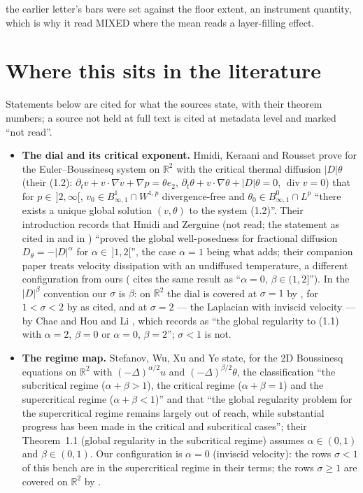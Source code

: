 \documentclass[11pt,a4paper]{article}
\newcommand{\R}{\mathbb{R}}
\newcommand{\abs}[1]{\lvert #1 \rvert}
\begin{document}
the earlier letter's bars were set against the floor extent, an instrument quantity, which is why it read MIXED where the mean reads a layer-filling effect.

\section{Where this sits in the literature}\label{sec:lit}

Statements below are cited for what the sources state, with their theorem numbers; a source not held at full text is cited at metadata level and marked ``not read''.

\begin{itemize}[leftmargin=1.5em]
\item \textbf{The dial and its critical exponent.} Hmidi, Keraani and Rousset \cite[Theorem~1.1]{HKR11} prove for the Euler--Boussinesq system on $\R^2$ with the critical thermal diffusion $\abs D\theta$ (their (1.2): $\partial_tv+v\cdot\nabla v+\nabla p=\theta e_2$, $\partial_t\theta+v\cdot\nabla\theta+\abs D\theta=0$, $\operatorname{div}v=0$) that for $p\in\,]2,\infty[$, $v_0\in B^1_{\infty,1}\cap W^{1,p}$ divergence-free and $\theta_0\in B^0_{\infty,1}\cap L^p$ ``there exists a unique global solution $(v,\theta)$ to the system (1.2)''. Their introduction records that Hmidi and Zerguine \cite{HZ10} (not read; the statement as cited in \cite[\S1]{HKR11} and in \cite[\S1]{SWXY26}) ``proved the global well-posedness for fractional diffusion $D_\theta=-\abs D^\alpha$ for $\alpha\in\,]1,2[$'', the case $\alpha=1$ being what \cite{HKR11} adds; their companion paper \cite{HKR10} treats velocity dissipation with an undiffused temperature, a different configuration from ours (\cite[\S1]{SWXY26} cites the same result as ``$\alpha=0$, $\beta\in(1,2]$''). In the $\abs D^\beta$ convention our $\sigma$ is $\beta$: on $\R^2$ the dial is covered at $\sigma=1$ by \cite{HKR11}, for $1<\sigma<2$ by \cite{HZ10} as cited, and at $\sigma=2$ --- the Laplacian with inviscid velocity --- by Chae \cite{Chae06} and Hou and Li \cite{HL05}, which \cite[\S1]{SWXY26} records as ``the global regularity to (1.1) with $\alpha=2$, $\beta=0$ or $\alpha=0$, $\beta=2$''; $\sigma<1$ is not.
\item \textbf{The regime map.} Stefanov, Wu, Xu and Ye \cite[\S1]{SWXY26} state, for the 2D Boussinesq equations on $\R^2$ with $(-\Delta)^{\alpha/2}u$ and $(-\Delta)^{\beta/2}\theta$, the classification ``the subcritical regime ($\alpha+\beta>1$), the critical regime ($\alpha+\beta=1$) and the supercritical regime ($\alpha+\beta<1$)'' and that ``the global regularity problem for the supercritical regime remains largely out of reach, while substantial progress has been made in the critical and subcritical cases''; their Theorem~1.1 (global regularity in the subcritical regime) assumes $\alpha\in(0,1)$ and $\beta\in(0,1)$. Our configuration is $\alpha=0$ (inviscid velocity): the rows $\sigma<1$ of this bench are in the supercritical regime in their terms; the rows $\sigma\ge1$ are covered on $\R^2$ by \cite{HKR11,HZ10,Chae06,HL05}.

\end{itemize}
\end{document}
